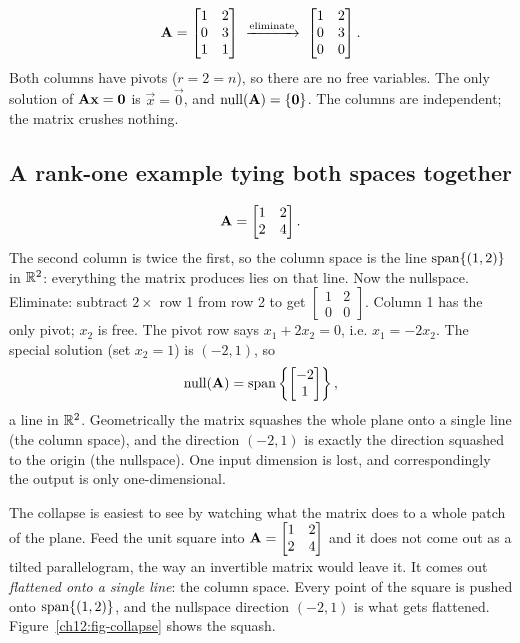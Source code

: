 \begin{example}\label{ch12:trivial-null}
\[
  \mathbf{A} = \begin{bmatrix} 1 & 2 \\ 0 & 3 \\ 1 & 1 \end{bmatrix}
  \;\xrightarrow{\text{eliminate}}\;
  \begin{bmatrix} 1 & 2 \\ 0 & 3 \\ 0 & 0 \end{bmatrix}.
\]
Both columns have pivots ($r=2=n$), so there are no free variables. The only
solution of $\mathbf{A}\mathbf{x}=\mathbf{0}$ is $\vec{x}=\vec{0}$, and
$\operatorname{null}(\mathbf{A})=\{\mathbf{0}\}$. The columns are independent; the matrix crushes
nothing.
\end{example}

\subsection{A rank-one example tying both spaces together}

\begin{example}\label{ch12:nullspace-line}
\[
  \mathbf{A} = \begin{bmatrix} 1 & 2 \\ 2 & 4 \end{bmatrix}.
\]
The second column is twice the first, so the column space is the line
$\operatorname{span}\{(1,2)\}$ in $\mathbb{R}^2$: everything the matrix produces lies on that line.
Now the nullspace. Eliminate: subtract $2\times$ row 1 from row 2 to get
$\begin{bmatrix}1 & 2\\0 & 0\end{bmatrix}$. Column 1 has the only pivot; $x_2$ is
free. The pivot row says $x_1 + 2x_2 = 0$, i.e. $x_1 = -2x_2$. The special
solution (set $x_2=1$) is $(-2,1)$, so
\[
  \operatorname{null}(\mathbf{A}) = \operatorname{span}\left\{\begin{bmatrix}-2\\1\end{bmatrix}\right\},
\]
a line in $\mathbb{R}^2$. Geometrically the matrix squashes the whole plane onto a single
line (the column space), and the direction $(-2,1)$ is exactly the direction
squashed to the origin (the nullspace). One input dimension is lost, and
correspondingly the output is only one-dimensional.
\end{example}

The collapse is easiest to see by watching what the matrix does to a whole
patch of the plane. Feed the unit square into $\mathbf{A}=\begin{bmatrix}1&2\\2&4
\end{bmatrix}$ and it does not come out as a tilted parallelogram, the way an
invertible matrix would leave it. It comes out \emph{flattened onto a single
line}: the column space. Every point of the square is pushed onto
$\operatorname{span}\{(1,2)\}$, and the nullspace direction $(-2,1)$ is what gets
flattened. Figure~\ref{ch12:fig-collapse} shows the squash.

